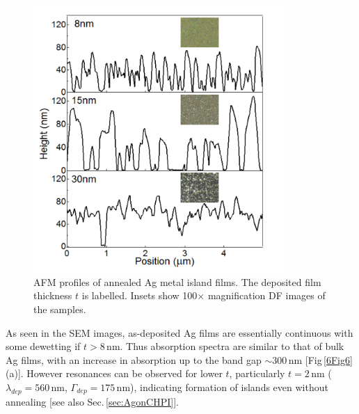 \begin{figure}[h!] 
\centering    
\includegraphics[width=0.85\textwidth]{Fig5}
\caption{AFM profiles of annealed Ag metal island films. The deposited film thickness $t$ is labelled. Insets show 100$\times$ magnification DF images of the samples.}
\label{6Fig5}
\end{figure}

As seen in the SEM images, as-deposited Ag films are essentially continuous with some dewetting if $t>8$\,nm. Thus absorption spectra are similar to that of bulk Ag films, with an increase in absorption up to the band gap $\sim300$\,nm [Fig\,\ref{6Fig6}(a)]. However resonances can be observed for lower $t$, particularly $t=2$\,nm ($\lambda_{dep} = 560$\,nm, $\Gamma_{dep} = 175$\,nm), indicating formation of islands even without annealing [see also Sec.\,\ref{sec:AgonCHPI}]. 

